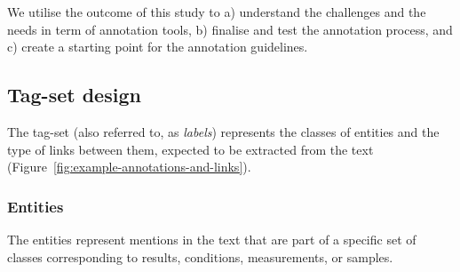 \documentclass[fleqn,10pt]{wlscirep}
\begin{document}
We utilise the outcome of this study to a) understand the challenges and the needs in term of annotation tools, b) finalise and test the annotation process, and c) create a starting point for the annotation guidelines.

\subsection*{Tag-set design}
The tag-set (also referred to, as \textit{labels}) represents the classes of entities and the type of links between them, expected to be extracted from the text (Figure~\ref{fig:example-annotations-and-links}).

\subsubsection*{Entities}
The entities represent mentions in the text that are part of a specific set of classes corresponding to results, conditions, measurements, or samples.
\end{document}
